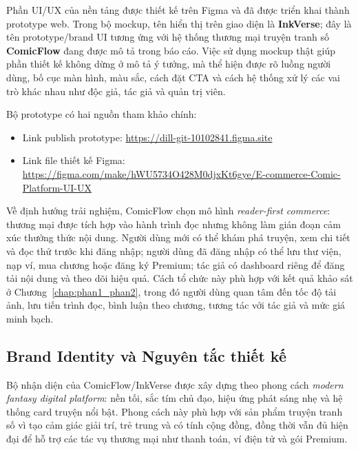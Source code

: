 Phần UI/UX của nền tảng được thiết kế trên Figma và đã được triển khai thành prototype web. Trong bộ mockup, tên hiển thị trên giao diện là \textbf{InkVerse}; đây là tên prototype/brand UI tương ứng với hệ thống thương mại truyện tranh số \textbf{ComicFlow} đang được mô tả trong báo cáo. Việc sử dụng mockup thật giúp phần thiết kế không dừng ở mô tả ý tưởng, mà thể hiện được rõ luồng người dùng, bố cục màn hình, màu sắc, cách đặt CTA và cách hệ thống xử lý các vai trò khác nhau như độc giả, tác giả và quản trị viên.

Bộ prototype có hai nguồn tham khảo chính:

\begin{itemize}
    \item Link publish prototype: \url{https://dill-git-10102841.figma.site}
    \item Link file thiết kế Figma: \url{https://figma.com/make/hWU5734O428M0djxKt6gye/E-commerce-Comic-Platform-UI-UX}
\end{itemize}

Về định hướng trải nghiệm, ComicFlow chọn mô hình \textit{reader-first commerce}: thương mại được tích hợp vào hành trình đọc nhưng không làm gián đoạn cảm xúc thưởng thức nội dung. Người dùng mới có thể khám phá truyện, xem chi tiết và đọc thử trước khi đăng nhập; người dùng đã đăng nhập có thể lưu thư viện, nạp ví, mua chương hoặc đăng ký Premium; tác giả có dashboard riêng để đăng tải nội dung và theo dõi hiệu quả. Cách tổ chức này phù hợp với kết quả khảo sát ở Chương~\ref{chap:phan1_phan2}, trong đó người dùng quan tâm đến tốc độ tải ảnh, lưu tiến trình đọc, bình luận theo chương, tương tác với tác giả và mức giá minh bạch.

\subsection{Brand Identity và Nguyên tắc thiết kế}

Bộ nhận diện của ComicFlow/InkVerse được xây dựng theo phong cách \textit{modern fantasy digital platform}: nền tối, sắc tím chủ đạo, hiệu ứng phát sáng nhẹ và hệ thống card truyện nổi bật. Phong cách này phù hợp với sản phẩm truyện tranh số vì tạo cảm giác giải trí, trẻ trung và có tính cộng đồng, đồng thời vẫn đủ hiện đại để hỗ trợ các tác vụ thương mại như thanh toán, ví điện tử và gói Premium.

